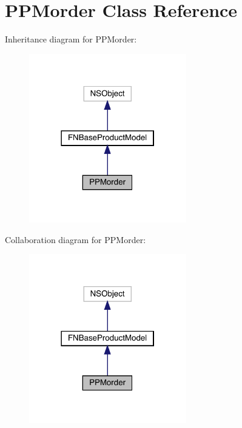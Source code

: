 \hypertarget{interface_p_p_morder}{}\section{P\+P\+Morder Class Reference}
\label{interface_p_p_morder}


Inheritance diagram for P\+P\+Morder\+:\nopagebreak
\begin{figure}[H]
\begin{center}
\leavevmode
\includegraphics[width=194pt]{interface_p_p_morder__inherit__graph}
\end{center}
\end{figure}


Collaboration diagram for P\+P\+Morder\+:\nopagebreak
\begin{figure}[H]
\begin{center}
\leavevmode
\includegraphics[width=194pt]{interface_p_p_morder__coll__graph}
\end{center}
\end{figure}
